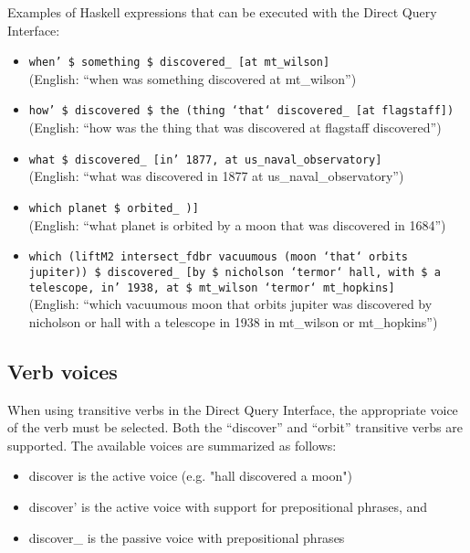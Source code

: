\documentclass[../main.tex]{subfiles}
\begin{document}
Examples of Haskell expressions that can be executed with the Direct Query Interface:
\begin{itemize}
	\item \texttt{when' \$ something \$ discovered\_ [at mt\_wilson]} \\(English: ``when was something discovered at mt\_wilson'')
	\item \texttt{how' \$ discovered \$
	\subitem the (thing `that` discovered\_ [at flagstaff])} \\(English: ``how was the thing that was discovered at flagstaff discovered'')
	\item \texttt{what \$ discovered\_ [in' 1877, at us\_naval\_observatory]} \\(English: ``what was discovered in 1877 at us\_naval\_observatory'')
	\item \texttt{which planet \$ orbited\_ 
		\subitem [by \$ a (moon `that` discovered\_ [in' 1684])]} \\(English: ``what planet is orbited by a moon that was discovered in 1684'')
	\item \texttt{which
		\subitem (liftM2 intersect\_fdbr vacuumous  (moon `that` orbits jupiter))
		\subitem \$ discovered\_ [by \$ nicholson `termor` hall, \subsubitem with \$ a telescope, in' 1938, \subsubitem at \$ mt\_wilson `termor` mt\_hopkins]}\\(English: ``which vacuumous moon that orbits jupiter was discovered by nicholson or hall with a telescope in 1938 in mt\_wilson or mt\_hopkins'')
\end{itemize}

\subsection{Verb voices}

When using transitive verbs in the Direct Query Interface, the appropriate voice of the verb must be selected.  Both the ``discover'' and ``orbit''
transitive verbs are supported.  The available voices are summarized as follows:

\begin{itemize}
	\item discover is the active voice (e.g. "hall discovered a moon")
	\item discover' is the active voice with support for prepositional phrases, and
	\item discover\_ is the passive voice with prepositional phrases
\end{itemize}
\end{document}
